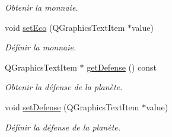 \begin{DoxyCompactItemize}
\begin{DoxyCompactList}\small\item\em Obtenir la monnaie. \end{DoxyCompactList}\item 
void \hyperlink{classQPlanet_abc0f1db1b8a8da1c42b930feb85e47d0}{set\-Eco} (Q\-Graphics\-Text\-Item $\ast$value)
\begin{DoxyCompactList}\small\item\em Définir la monnaie. \end{DoxyCompactList}\item 
Q\-Graphics\-Text\-Item $\ast$ \hyperlink{classQPlanet_a0de20a9512169695c64116151adb3761}{get\-Defense} () const 
\begin{DoxyCompactList}\small\item\em Obtenir la défense de la planète. \end{DoxyCompactList}\item 
void \hyperlink{classQPlanet_a964574ef33918465d68827e918e89b94}{set\-Defense} (Q\-Graphics\-Text\-Item $\ast$value)
\begin{DoxyCompactList}\small\item\em Définir la défense de la planète. \end{DoxyCompactList}\end{DoxyCompactItemize}
